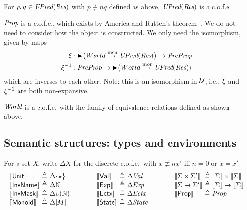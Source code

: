 For $p,q\in\textit{UPred}(\textit{Res})$ with $p \nequiv{n} q$ defined
as above, $\textit{UPred}(\textit{Res})$ is a 
c.o.f.e.

$\textit{Prop}$ is a c.o.f.e., which exists by America and Rutten's theorem~\cite{America-Rutten:JCSS89}.
We do not need to consider how the object is constructed. 
We only need the isomorphism, given by maps
\begin{align*}
	\xi &: \mathord{\blacktriangleright} \bigl(World \stackrel{\textrm{mon}}{\rightarrow} \textit{UPred}(\textit{Res})\bigr) \to \textit{PreProp} \\
	\xi^{-1} &: \textit{PreProp} \to \mathord{\blacktriangleright} \bigl(World \stackrel{\textrm{mon}}{\rightarrow} \textit{UPred}(\textit{Res})\bigr)
\end{align*}
which are inverses to each other. 
Note: this is an isomorphism in $\cal U$, i.e., $\xi$ and
$\xi^{-1}$ are both non-expansive.

$\textit{World}$ is a c.o.f.e.\ with the family of equivalence
relations defined as shown above.

\subsection{Semantic structures: types and environments}

For a set $X$, write $\Delta X$ for the discrete c.o.f.e.\ with $x \nequiv{n}
x'$ iff $n = 0$ or $x = x'$
\[
\begin{array}[t]{@{}l@{\ }c@{\ }l@{}}
\Sem{\textsort{Unit}} &\eqdef& \Delta \{ \star \} \\
\Sem{\textsort{InvName}} &\eqdef& \Delta \mathbb{N}  \\
\Sem{\textsort{InvMask}} &\eqdef& \Delta \pset{\mathbb{N}} \\
\Sem{\textsort{Monoid}} &\eqdef& \Delta |\monoid|
\end{array}
\qquad\qquad
\begin{array}[t]{@{}l@{\ }c@{\ }l@{}}
\Sem{\textsort{Val}} &\eqdef& \Delta \textdom{Val} \\
\Sem{\textsort{Exp}} &\eqdef& \Delta \textdom{Exp} \\
\Sem{\textsort{Ectx}} &\eqdef& \Delta \textdom{Ectx} \\
\Sem{\textsort{State}} &\eqdef& \Delta \textdom{State} \\
\end{array}
\qquad\qquad
\begin{array}[t]{@{}l@{\ }c@{\ }l@{}}
\Sem{\sort \times \sort'} &\eqdef& \Sem{\sort} \times \Sem{\sort} \\
\Sem{\sort \to \sort'} &\eqdef& \Sem{\sort} \to \Sem{\sort} \\
\Sem{\Prop} &\eqdef& \textdom{Prop} \\
\end{array}
\]

